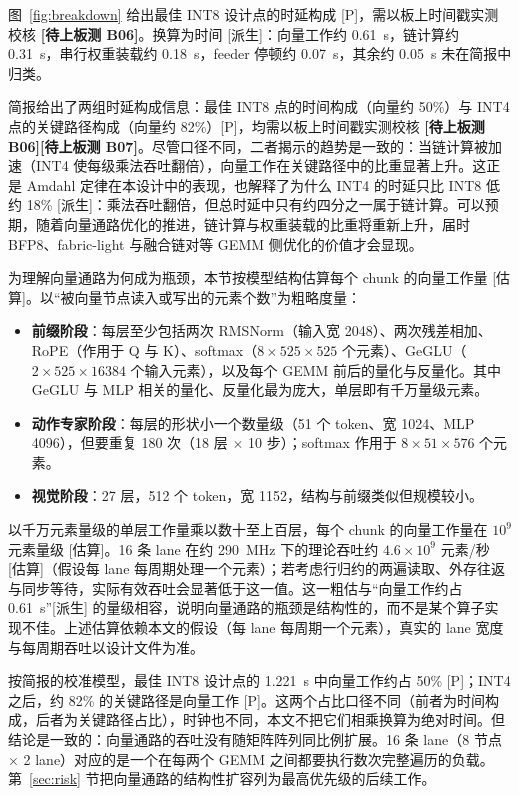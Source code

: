 \documentclass[a4paper,10.5pt]{ctexart}
\newcommand{\tP}{\textsf{[P]}}              %
\newcommand{\tD}{\textsf{[派生]}}           %
\newcommand{\tE}{\textsf{[估算]}}           %
\newcommand{\tB}[1]{\textcolor{red!70!black}{\textsf{\textbf{[待上板测 #1]}}}}
\begin{document}
图~\ref{fig:breakdown} 给出最佳 INT8 设计点的时延构成 \tP，需以板上时间戳实测校核 \tB{B06}。换算为时间 \tD：向量工作约 0.61~s，链计算约 0.31~s，串行权重装载约 0.18~s，feeder 停顿约 0.07~s，其余约 0.05~s 未在简报中归类。

简报给出了两组时延构成信息：最佳 INT8 点的时间构成（向量约 50\%）与 INT4 点的关键路径构成（向量约 82\%）\tP，均需以板上时间戳实测校核 \tB{B06}\tB{B07}。尽管口径不同，二者揭示的趋势是一致的：当链计算被加速（INT4 使每级乘法吞吐翻倍），向量工作在关键路径中的比重显著上升。这正是 Amdahl 定律在本设计中的表现，也解释了为什么 INT4 的时延只比 INT8 低约 18\% \tD：乘法吞吐翻倍，但总时延中只有约四分之一属于链计算。可以预期，随着向量通路优化的推进，链计算与权重装载的比重将重新上升，届时 BFP8、fabric-light 与融合链对等 GEMM 侧优化的价值才会显现。

为理解向量通路为何成为瓶颈，本节按模型结构估算每个 chunk 的向量工作量 \tE。以“被向量节点读入或写出的元素个数”为粗略度量：
\begin{itemize}
  \item \textbf{前缀阶段}：每层至少包括两次 RMSNorm（输入宽 2048）、两次残差相加、RoPE（作用于 Q 与 K）、softmax（$8\times525\times525$ 个元素）、GeGLU（$2\times525\times16384$ 个输入元素），以及每个 GEMM 前后的量化与反量化。其中 GeGLU 与 MLP 相关的量化、反量化最为庞大，单层即有千万量级元素。
  \item \textbf{动作专家阶段}：每层的形状小一个数量级（51 个 token、宽 1024、MLP 4096），但要重复 180 次（18 层 $\times$ 10 步）；softmax 作用于 $8\times51\times576$ 个元素。
  \item \textbf{视觉阶段}：27 层，512 个 token，宽 1152，结构与前缀类似但规模较小。
\end{itemize}
以千万元素量级的单层工作量乘以数十至上百层，每个 chunk 的向量工作量在 $10^9$ 元素量级 \tE。16 条 lane 在约 290~MHz 下的理论吞吐约 $4.6\times10^9$ 元素/秒 \tE（假设每 lane 每周期处理一个元素）；若考虑行归约的两遍读取、外存往返与同步等待，实际有效吞吐会显著低于这一值。这一粗估与“向量工作约占 0.61~s”\tD{} 的量级相容，说明向量通路的瓶颈是结构性的，而不是某个算子实现不佳。上述估算依赖本文的假设（每 lane 每周期一个元素），真实的 lane 宽度与每周期吞吐以设计文件为准。

按简报的校准模型，最佳 INT8 设计点的 1.221~s 中向量工作约占 50\% \tP；INT4 之后，约 82\% 的关键路径是向量工作 \tP。这两个占比口径不同（前者为时间构成，后者为关键路径占比），时钟也不同，本文不把它们相乘换算为绝对时间。但结论是一致的：向量通路的吞吐没有随矩阵阵列同比例扩展。16 条 lane（8 节点 $\times$ 2 lane）对应的是一个在每两个 GEMM 之间都要执行数次完整遍历的负载。第~\ref{sec:risk} 节把向量通路的结构性扩容列为最高优先级的后续工作。
\end{document}
